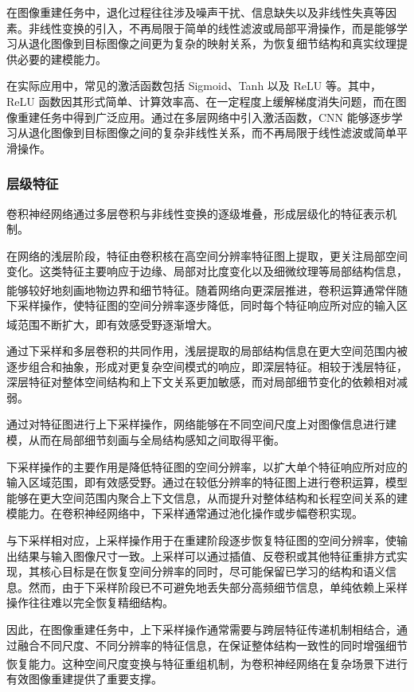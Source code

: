 在图像重建任务中，退化过程往往涉及噪声干扰、信息缺失以及非线性失真等因素。非线性变换的引入，不再局限于简单的线性滤波或局部平滑操作，而是能够学习从退化图像到目标图像之间更为复杂的映射关系，为恢复细节结构和真实纹理提供必要的建模能力。

在实际应用中，常见的激活函数包括 Sigmoid、Tanh 以及 ReLU 等。其中，ReLU 函数因其形式简单、计算效率高、在一定程度上缓解梯度消失问题，而在图像重建任务中得到广泛应用。通过在多层网络中引入激活函数，CNN 能够逐步学习从退化图像到目标图像之间的复杂非线性关系，而不再局限于线性滤波或简单平滑操作。

\subsubsection{层级特征}

卷积神经网络通过多层卷积与非线性变换的逐级堆叠，形成层级化的特征表示机制。

在网络的浅层阶段，特征由卷积核在高空间分辨率特征图上提取，更关注局部空间变化。这类特征主要响应于边缘、局部对比度变化以及细微纹理等局部结构信息，能够较好地刻画地物边界和细节特征\textsuperscript{\cite{zeiler2014visualizing}}。随着网络向更深层推进，卷积运算通常伴随下采样操作，使特征图的空间分辨率逐步降低，同时每个特征响应所对应的输入区域范围不断扩大，即有效感受野逐渐增大\textsuperscript{\cite{luo2016understanding}}。

通过下采样和多层卷积的共同作用，浅层提取的局部结构信息在更大空间范围内被逐步组合和抽象，形成对更复杂空间模式的响应，即深层特征。相较于浅层特征，深层特征对整体空间结构和上下文关系更加敏感，而对局部细节变化的依赖相对减弱。

通过对特征图进行上下采样操作，网络能够在不同空间尺度上对图像信息进行建模，从而在局部细节刻画与全局结构感知之间取得平衡。

下采样操作的主要作用是降低特征图的空间分辨率，以扩大单个特征响应所对应的输入区域范围，即有效感受野。通过在较低分辨率的特征图上进行卷积运算，模型能够在更大空间范围内聚合上下文信息，从而提升对整体结构和长程空间关系的建模能力。在卷积神经网络中，下采样通常通过池化操作或步幅卷积实现。

与下采样相对应，上采样操作用于在重建阶段逐步恢复特征图的空间分辨率，使输出结果与输入图像尺寸一致。上采样可以通过插值、反卷积或其他特征重排方式实现，其核心目标是在恢复空间分辨率的同时，尽可能保留已学习的结构和语义信息。然而，由于下采样阶段已不可避免地丢失部分高频细节信息，单纯依赖上采样操作往往难以完全恢复精细结构。

因此，在图像重建任务中，上下采样操作通常需要与跨层特征传递机制相结合，通过融合不同尺度、不同分辨率的特征信息，在保证整体结构一致性的同时增强细节恢复能力\textsuperscript{\cite{lin2017feature}}。这种空间尺度变换与特征重组机制，为卷积神经网络在复杂场景下进行有效图像重建提供了重要支撑。

